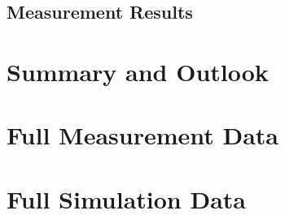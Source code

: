 \documentclass[
	german,%
	accentcolor=9c,%
	ruledheaders=section,%
	class=report,%
	thesis={type=bachelor},%
	fontsize=11pt,%
	parskip=half-,%
	custommargins=false,%
	marginpar=false,%
	BCOR = 0mm,%
 	logofile=tools/logo-installation/TUDa-logos/tuda_logo.png,%
]{tudapub}
\begin{document}
\section{Measurement Results}



\chapter{Summary and Outlook}


\appendix
\chapter{Full Measurement Data}

\chapter{Full Simulation Data}


\printbibliography
\end{document}
